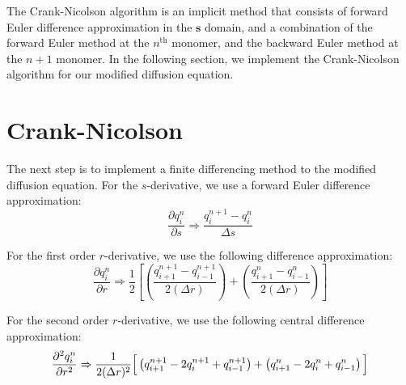 \documentclass[11pt]{article} %
\begin{document}
The Crank-Nicolson algorithm is an implicit method that consists of forward Euler difference approximation in the $\textbf{s}$ domain, and a combination of the forward Euler method at the $n^{\text{th}}$ monomer, and the backward Euler method at the $n+1$ monomer. In the following section, we implement the Crank-Nicolson algorithm for our modified diffusion equation. 

\section*{Crank-Nicolson}
The next step is to implement a finite differencing method to the modified diffusion equation.  For the $s$-derivative, we use a forward Euler difference approximation:
\begin{equation}
\frac{\partial q_i^n}{\partial s} \Rightarrow \dfrac{q_{i}^{n+1} - q_{i}^n}{\Delta s}
\end{equation}

\noindent
For the first order $r$-derivative, we use the following difference approximation:
\begin{equation}
\frac{\partial q_i^n}{\partial r}  \Rightarrow \frac{1}{2} \left[\left(\frac{q_{i+1}^{n+1} - q_{i-1}^{n+1}}{2(\Delta r)} \right)+ \left(\frac{q_{i+1}^{n} - q_{i-1}^{n}}{2(\Delta r)} \right) \right]
\end{equation}

\noindent
For the second order $r$-derivative, we use the following central difference approximation:
\begin{equation}
\frac{\partial^2 q_i^n}{\partial r^2} \Rightarrow \frac{1}{2(\Delta r)^2} \textbf{\Big[} \left( q_{i+1}^{n+1} -2q_{i}^{n+1} + q_{i-1}^{n+1} \right)+\left( q_{i+1}^{n} -2q_{i}^{n} + q_{i-1}^{n} \right) \textbf{\Big]}
\end{equation}
\end{document}
